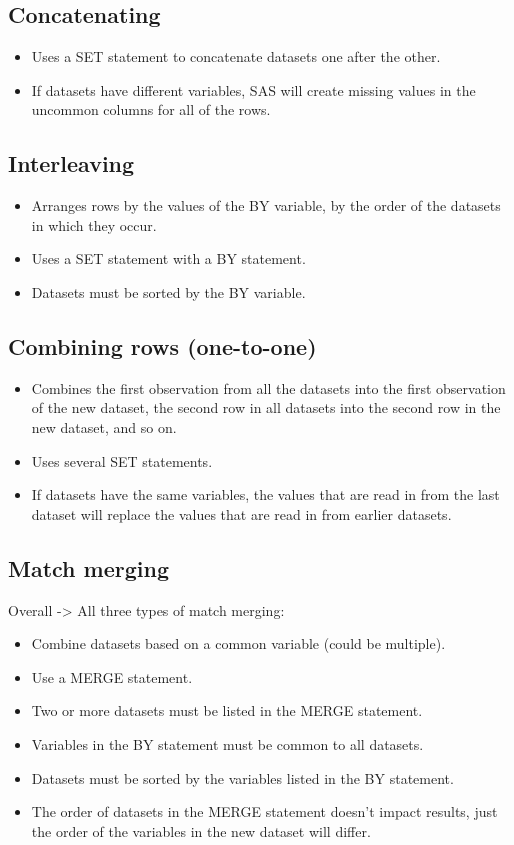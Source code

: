 \documentclass[11pt, oneside]{article}
\begin{document}
\subsection{Concatenating}
\begin{itemize}
\item Uses a SET statement to concatenate datasets one after the other.
\item If datasets have different variables, SAS will create missing values in the uncommon columns for all of the rows.
\end{itemize}


\subsection{Interleaving}
\begin{itemize}
\item Arranges rows by the values of the BY variable, by the order of the datasets in which they occur.
\item Uses a SET statement with a BY statement.
\item Datasets must be sorted by the BY variable.
\end{itemize}


\subsection{Combining rows (one-to-one)}
\begin{itemize}
\item Combines the first observation from all the datasets into the first observation of the new dataset, the second row in all datasets into the second row in the new dataset, and so on.
\item Uses several SET statements.
\item If datasets have the same variables, the values that are read in from the last dataset will replace the values that are read in from earlier datasets.
\end{itemize}


\subsection{Match merging}

Overall -> All three types of match merging:
\begin{itemize}
\item Combine datasets based on a common variable (could be multiple).
\item Use a MERGE statement.
\item Two or more datasets must be listed in the MERGE statement.
\item Variables in the BY statement must be common to all datasets.
\item Datasets must be sorted by the variables listed in the BY statement.
\item The order of datasets in the MERGE statement doesn't impact results, just the order of the variables in the new dataset will differ.
\end{itemize}
\end{document}
